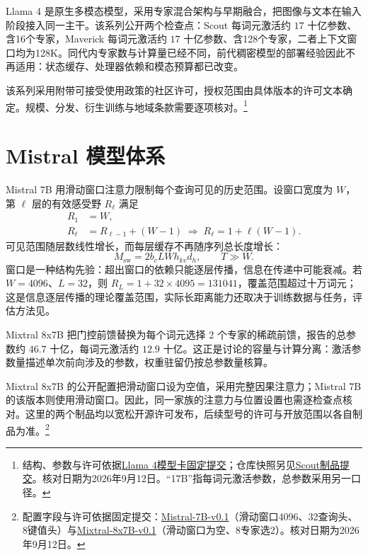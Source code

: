 \documentclass[../textbook.tex]{subfiles}
\begin{document}
Llama 4 是原生多模态模型，采用专家混合架构与早期融合，把图像与文本在输入阶段接入同一主干\cite{meta2025llama4modelcard}。该系列公开两个检查点：Scout 每词元激活约 $17$ 十亿参数、含16个专家，Maverick 每词元激活约 $17$ 十亿参数、含128个专家，二者上下文窗口均为128K。同代内专家数与计算量已经不同，前代稠密模型的部署经验因此不再适用：状态缓存、处理器依赖和模态预算都已改变。

该系列采用附带可接受使用政策的社区许可，授权范围由具体版本的许可文本确定。规模、分发、衍生训练与地域条款需要逐项核对。\footnote{结构、参数与许可依据\href{https://github.com/meta-llama/llama-models/blob/038acb9fe1e1ddc5cf1b3989fb07b311a0ffcae4/models/llama4/MODEL_CARD.md}{Llama 4模型卡固定提交}；仓库快照另见\href{https://huggingface.co/meta-llama/Llama-4-Scout-17B-16E/tree/14d516bdff6ac06cec40678529222f193386189c}{Scout制品提交}。核对日期为2026年9月12日。“17B”指每词元激活参数，总参数采用另一口径。}

\section{Mistral 模型体系}
Mistral 7B 用滑动窗口注意力限制每个查询可见的历史范围\cite{mistral2023sevenb}。设窗口宽度为 $W$，第 $\ell$ 层的有效感受野 $R_\ell$ 满足
\begin{equation}
 \begin{aligned}
  R_1 &= W, \\
  R_\ell &= R_{\ell-1}+(W-1) \;\Longrightarrow\; R_\ell=1+\ell(W-1).
 \end{aligned}
\end{equation}
可见范围随层数线性增长，而每层缓存不再随序列总长度增长：
\begin{equation}
 M_{\mathrm{sw}}=2b_cLWh_{kv}d_h,\qquad T\gg W .
\end{equation}
窗口是一种结构先验：超出窗口的依赖只能逐层传播，信息在传递中可能衰减。若 $W=4096$、$L=32$，则 $R_L=1+32\times4095=131041$，覆盖范围超过十万词元；这是信息逐层传播的理论覆盖范围，实际长距离能力还取决于训练数据与任务，评估方法见。

Mixtral 8x7B 把门控前馈替换为每个词元选择 2 个专家的稀疏前馈，报告的总参数约 $46.7$ 十亿，每词元激活约 $12.9$ 十亿\cite{jiang2024mixtral}。这正是讨论的容量与计算分离：激活参数量描述单次前向涉及的参数，权重驻留仍按总参数量核算。

Mixtral 8x7B 的公开配置把滑动窗口设为空值，采用完整因果注意力；Mistral 7B 的该版本则使用滑动窗口。因此，同一家族的注意力与位置设置也需逐检查点核对。这里的两个制品均以宽松开源许可发布，后续型号的许可与开放范围以各自制品为准。\footnote{配置字段与许可依据固定提交：\href{https://huggingface.co/mistralai/Mistral-7B-v0.1/tree/27d67f1b5f57dc0953326b2601d68371d40ea8da}{Mistral-7B-v0.1}（滑动窗口4096、32查询头、8键值头）与\href{https://huggingface.co/mistralai/Mixtral-8x7B-v0.1/tree/fc7ac94680e38d7348cfa806e51218e6273104b0}{Mixtral-8x7B-v0.1}（滑动窗口为空、8专家选2）。核对日期为2026年9月12日。}
\end{document}
